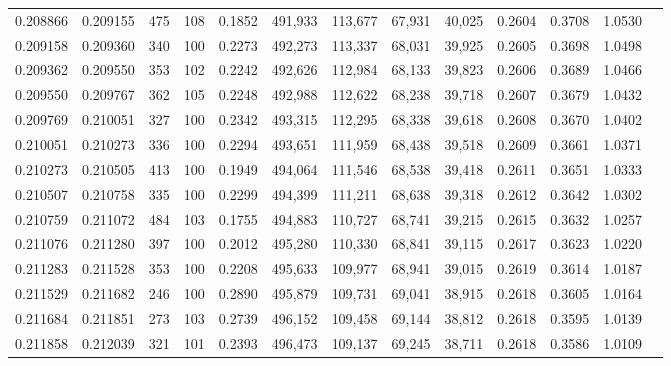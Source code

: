 \begin{tabular}{rrrrrrrrrrrrr}
0.208866 & 0.209155 &   475 & 108 &                                     0.1852 & 491,933 & 113,677 &  67,931 &  40,025 & 0.2604 & 0.3708 & 1.0530 \\
0.209158 & 0.209360 &   340 & 100 &                                     0.2273 & 492,273 & 113,337 &  68,031 &  39,925 & 0.2605 & 0.3698 & 1.0498 \\
0.209362 & 0.209550 &   353 & 102 &                                     0.2242 & 492,626 & 112,984 &  68,133 &  39,823 & 0.2606 & 0.3689 & 1.0466 \\
0.209550 & 0.209767 &   362 & 105 &                                     0.2248 & 492,988 & 112,622 &  68,238 &  39,718 & 0.2607 & 0.3679 & 1.0432 \\
0.209769 & 0.210051 &   327 & 100 &                                     0.2342 & 493,315 & 112,295 &  68,338 &  39,618 & 0.2608 & 0.3670 & 1.0402 \\
0.210051 & 0.210273 &   336 & 100 &                                     0.2294 & 493,651 & 111,959 &  68,438 &  39,518 & 0.2609 & 0.3661 & 1.0371 \\
0.210273 & 0.210505 &   413 & 100 &                                     0.1949 & 494,064 & 111,546 &  68,538 &  39,418 & 0.2611 & 0.3651 & 1.0333 \\
0.210507 & 0.210758 &   335 & 100 &                                     0.2299 & 494,399 & 111,211 &  68,638 &  39,318 & 0.2612 & 0.3642 & 1.0302 \\
0.210759 & 0.211072 &   484 & 103 &                                     0.1755 & 494,883 & 110,727 &  68,741 &  39,215 & 0.2615 & 0.3632 & 1.0257 \\
0.211076 & 0.211280 &   397 & 100 &                                     0.2012 & 495,280 & 110,330 &  68,841 &  39,115 & 0.2617 & 0.3623 & 1.0220 \\
0.211283 & 0.211528 &   353 & 100 &                                     0.2208 & 495,633 & 109,977 &  68,941 &  39,015 & 0.2619 & 0.3614 & 1.0187 \\
0.211529 & 0.211682 &   246 & 100 &                                     0.2890 & 495,879 & 109,731 &  69,041 &  38,915 & 0.2618 & 0.3605 & 1.0164 \\
0.211684 & 0.211851 &   273 & 103 &                                     0.2739 & 496,152 & 109,458 &  69,144 &  38,812 & 0.2618 & 0.3595 & 1.0139 \\
0.211858 & 0.212039 &   321 & 101 &                                     0.2393 & 496,473 & 109,137 &  69,245 &  38,711 & 0.2618 & 0.3586 & 1.0109 \\

\end{tabular}

